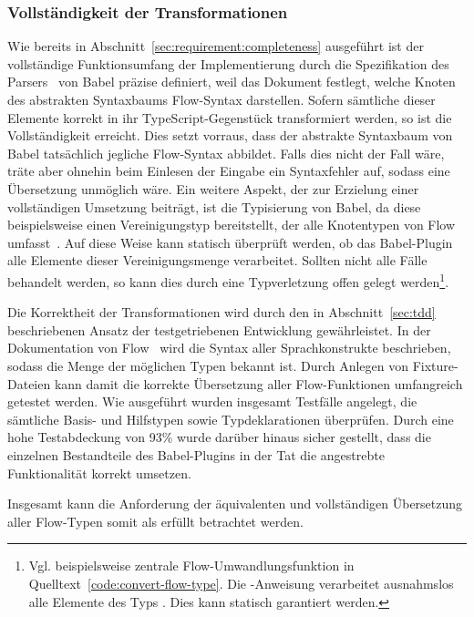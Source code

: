 \subsubsection{Vollständigkeit der Transformationen}

Wie bereits in Abschnitt~\ref{sec:requirement:completeness} ausgeführt ist der vollständige Funktionsumfang der Implementierung durch die Spezifikation des Parsers~\autocite{BABEL:PARSER_SPEC} von Babel präzise definiert, weil das Dokument festlegt, welche Knoten des abstrakten Syntaxbaums Flow-Syntax darstellen. Sofern sämtliche dieser Elemente korrekt in ihr TypeScript-Gegenstück transformiert werden, so ist die Vollständigkeit erreicht. Dies setzt vorraus, dass der abstrakte Syntaxbaum von Babel tatsächlich jegliche Flow-Syntax abbildet. Falls dies nicht der Fall wäre, träte aber ohnehin beim Einlesen der Eingabe ein Syntaxfehler auf, sodass eine Übersetzung unmöglich wäre. Ein weitere Aspekt, der zur Erzielung einer vollständigen Umsetzung beiträgt, ist die Typisierung von Babel, da diese beispielsweise einen Vereinigungstyp  bereitstellt, der alle Knotentypen von Flow umfasst~\autocite{BABEL:TYPES}. Auf diese Weise kann statisch überprüft werden, ob das Babel-Plugin alle Elemente dieser Vereinigungsmenge verarbeitet. Sollten nicht alle Fälle behandelt werden, so kann dies durch eine Typverletzung offen gelegt werden\footnote{Vgl. beispielsweise zentrale Flow-Umwandlungsfunktion in Quelltext~\ref{code:convert-flow-type}. Die -Anweisung verarbeitet ausnahmslos alle Elemente des Typs . Dies kann statisch garantiert werden.}.

Die Korrektheit der Transformationen wird durch den in Abschnitt~\ref{sec:tdd} beschriebenen Ansatz der testgetriebenen Entwicklung gewährleistet. In der Dokumentation von Flow~\autocite{FLOW:TYPE_ANNOTATIONS} wird die Syntax aller Sprachkonstrukte beschrieben, sodass die Menge der möglichen Typen bekannt ist. Durch Anlegen von Fixture-Dateien kann damit die korrekte Übersetzung aller Flow-Funktionen umfangreich getestet werden. Wie ausgeführt wurden insgesamt \numberOfTests Testfälle angelegt, die sämtliche Basis- und Hilfstypen sowie Typdeklarationen überprüfen. Durch eine hohe Testabdeckung von 93\% wurde darüber hinaus sicher gestellt, dass die einzelnen Bestandteile des Babel-Plugins in der Tat die angestrebte Funktionalität korrekt umsetzen.

Insgesamt kann die Anforderung der äquivalenten und vollständigen Übersetzung aller Flow-Typen somit als erfüllt betrachtet werden.

